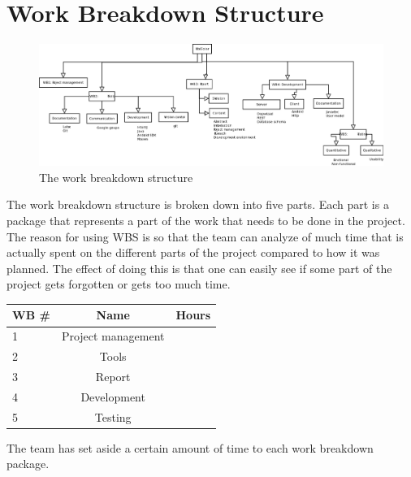 \section{Work Breakdown Structure}

\begin{figure}[H]
\includegraphics[width=\textwidth]{ch/projectPlan/fig/WBS.png}
\caption{The work breakdown structure}
\end{figure}

The work breakdown structure is broken down into five parts. Each part is a package that represents a part of the work that needs to be done in the project.
The reason for using WBS is so that the team can analyze of much time that is actually spent on the different parts of the project compared to how it was planned.
The effect of doing this is that one can easily see if some part of the project gets forgotten or gets too much time.

\begin{table}[H]
\centering
{}
\begin{tabular}{l c r}
    \textbf{WB \#} & \textbf{Name} & \textbf{Hours} \\\hline
    1 & Project management & \\\hline
    2 & Tools & \\\hline
    3 & Report & \\\hline
    4 & Development & \\\hline
    5 & Testing  & \\\hline
\end{tabular}
\end{table}

The team has set aside a certain amount of time to each work breakdown package.
